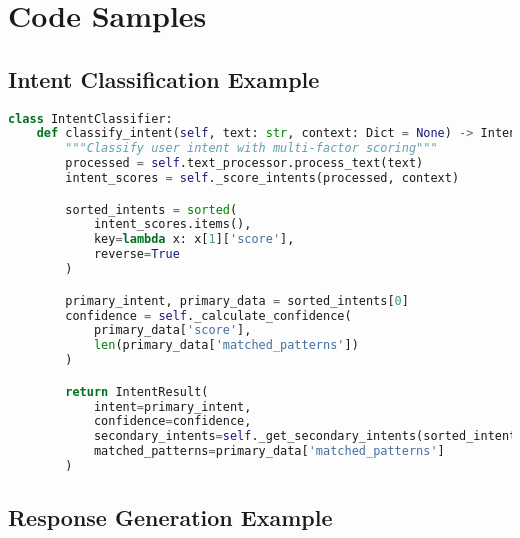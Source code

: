 \documentclass[12pt,a4paper]{article}
\begin{document}
\newpage
\appendix

\section{Code Samples}

\subsection{Intent Classification Example}

\begin{lstlisting}[language=Python, caption=Intent Classification Implementation]
class IntentClassifier:
    def classify_intent(self, text: str, context: Dict = None) -> IntentResult:
        """Classify user intent with multi-factor scoring"""
        processed = self.text_processor.process_text(text)
        intent_scores = self._score_intents(processed, context)

        sorted_intents = sorted(
            intent_scores.items(),
            key=lambda x: x[1]['score'],
            reverse=True
        )

        primary_intent, primary_data = sorted_intents[0]
        confidence = self._calculate_confidence(
            primary_data['score'],
            len(primary_data['matched_patterns'])
        )

        return IntentResult(
            intent=primary_intent,
            confidence=confidence,
            secondary_intents=self._get_secondary_intents(sorted_intents),
            matched_patterns=primary_data['matched_patterns']
        )
\end{lstlisting}

\subsection{Response Generation Example}
\end{document}

